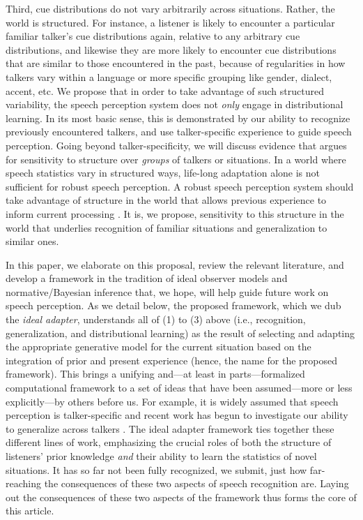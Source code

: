 Third, cue distributions do not vary arbitrarily across situations.  Rather, the world is structured.  For instance, a listener is likely to encounter a particular familiar talker's cue distributions again, relative to any arbitrary cue distributions, and likewise they are more likely to encounter cue distributions that are similar to those encountered in the past, because of regularities in how talkers vary within a language or more specific grouping like gender, dialect, accent, etc.  We propose that in order to take advantage of such structured variability, the speech perception system does not \emph{only} engage in distributional learning. In its most basic sense, this is demonstrated
by our ability to recognize previously encountered talkers, and use talker-specific experience to guide speech perception. 
Going beyond talker-specificity, we will discuss evidence that argues for sensitivity to structure over
\emph{groups} of talkers or situations. In a world where speech statistics vary in structured ways, life-long adaptation alone is not sufficient for robust speech perception. A robust speech perception system should take advantage of structure in the world that allows previous experience to inform current processing \autocite[for similar reasoning applied
to other cognitive domains, cf.][]{Qian2012}. It is, we propose, sensitivity to this structure in the world that underlies recognition of familiar situations and generalization to similar ones.

In this paper, we elaborate on this proposal, review the relevant literature, and develop a framework in the tradition of ideal observer models and normative/Bayesian inference \autocite{Anderson1990} that, we hope, will help guide future work on speech perception. As we detail below, the proposed framework, which we dub the {\em ideal adapter}, understands all of (1) to (3) above (i.e., recognition, generalization, and distributional learning) as the result of selecting and adapting the appropriate generative model for the current situation based on the integration of prior and present experience (hence, the name for the proposed framework). 
This brings a unifying and---at least in parts---formalized computational framework to a set of ideas that have been assumed---more or less explicitly---by others before us. For example, it is widely assumed that speech perception is talker-specific \autocite[e.g.,][]{Creel2011,Pardo2006,Pisoni2007} and recent work has begun to investigate our ability to generalize across talkers \autocite[e.g.,][]{Bradlow2008,Eisner2005,Kraljic2007,Sidaras2009}. The ideal adapter framework ties together these different lines of work, emphasizing 
the crucial roles of both the structure of listeners' prior knowledge \emph{and} their ability to learn the statistics of novel situations. It has so far not been fully recognized, we submit, just how far-reaching the consequences of these two aspects of speech recognition are. Laying out the consequences of these two aspects of the framework thus forms the core of this article.

